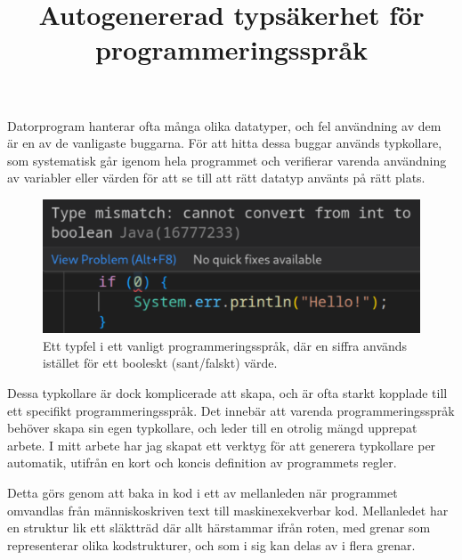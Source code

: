 \documentclass{popsci}
\title{Autogenererad typsäkerhet för programmeringsspråk}
\begin{document}


{\noindent
Datorprogram hanterar ofta många olika datatyper, och fel användning av dem är en av de vanligaste buggarna.
För att hitta dessa buggar används typkollare, som systematisk går igenom hela programmet och verifierar varenda användning av variabler eller värden för att se till att rätt datatyp använts på rätt plats.

\begin{figure}[!bth] %
\includegraphics[width=\columnwidth]{typeerror.png}
\caption*{Ett typfel i ett vanligt programmeringsspråk, där en siffra används istället för ett booleskt (sant/falskt) värde.}
\end{figure}

Dessa typkollare är dock komplicerade att skapa, och är ofta starkt kopplade till ett specifikt programmeringsspråk.
Det innebär att varenda programmeringsspråk behöver skapa sin egen typkollare, och leder till en otrolig mängd upprepat arbete.
I mitt arbete har jag skapat ett verktyg för att generera typkollare per automatik, utifrån en kort och koncis definition av programmets regler.

Detta görs genom att baka in kod i ett av mellanleden när programmet omvandlas från människoskriven text till maskinexekverbar kod.
Mellanledet har en struktur lik ett släktträd där allt härstammar ifrån roten, med grenar som representerar olika kodstrukturer, och som i sig kan delas av i flera grenar.


}
\end{document}
